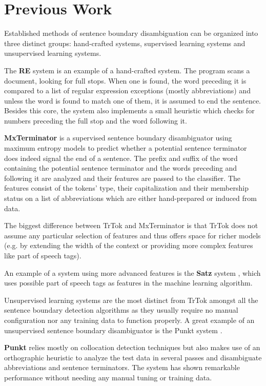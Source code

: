 \section{Previous Work}
\label{sec:previous-work}

Established methods of sentence boundary disambiguation can be
organized into three distinct groups: hand-crafted systems, supervised
learning systems and unsupervised learning systems.

The \textbf{RE} system \cite{sbd-re} is an example of a hand-crafted
system. The program scans a document, looking for full stops. When one
is found, the word preceding it is compared to a list of regular
expression exceptions (mostly abbreviations) and unless the word is
found to match one of them, it is assumed to end the sentence. Besides
this core, the system also implements a small heuristic which checks
for numbers preceding the full stop and the word following it.

\textbf{MxTerminator} \cite{sbd-mxterm} is a supervised sentence
boundary disambiguator using maximum entropy models to predict whether
a potential sentence terminator does indeed signal the end of a
sentence. The prefix and suffix of the word containing the potential
sentence terminator and the words preceding and following it are
analyzed and their features are passed to the classifier. The features
consist of the tokens' type, their capitalization and their membership
status on a list of abbreviations which are either hand-prepared or
induced from data.

The biggest difference between TrTok and MxTerminator is that TrTok
does not assume any particular selection of features and thus offers
space for richer models (e.g. by extending the width of the context or
providing more complex features like part of speech tags).

An example of a system using more advanced features is the
\textbf{Satz} system \cite{sbd-satz}, which uses possible part of
speech tags as features in the machine learning algorithm.

Unsupervised learning systems are the most distinct from TrTok amongst
all the sentence boundary detection algorithms as they usually require
no manual configuration nor any training data to function properly. A
great example of an unsupervised sentence boundary disambiguator is
the Punkt system \cite{sbd-punkt}.

\textbf{Punkt} relies mostly on collocation detection techniques but
also makes use of an orthographic heuristic to analyze the test data
in several passes and disambiguate abbreviations and sentence
terminators. The system has shown remarkable performance without
needing any manual tuning or training data.
